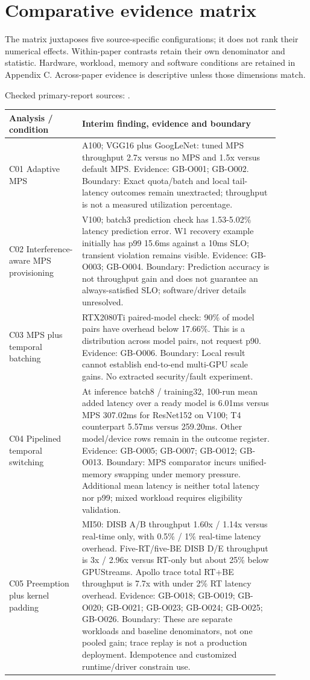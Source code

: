 \documentclass[12pt,a4paper]{article}
\begin{document}
\section{Comparative evidence matrix}
The matrix juxtaposes five source-specific configurations; it does not rank their numerical effects. Within-paper contrasts retain their own denominator and statistic. Hardware, workload, memory and software conditions are retained in Appendix C. Across-paper evidence is descriptive unless those dimensions match.


Checked primary-report sources: \cite{vastpipe,igniter,gpulets,pipeswitch,reef}. 
\begin{longtable}{p{0.24\linewidth}p{0.65\linewidth}}
\toprule
Analysis /\allowbreak{} condition & Interim finding, evidence and boundary\\\midrule
\endhead
C01 Adaptive MPS & A100; VGG16 plus GoogLeNet: tuned MPS throughput 2.7x versus no MPS and 1.5x versus default MPS. Evidence: GB-O001; GB-O002. Boundary: Exact quota/\allowbreak{}batch and local tail-latency outcomes remain unextracted; throughput is not a measured utilization percentage.\\
C02 Interference-aware MPS provisioning & V100; batch3 prediction check has 1.53-5.02\% latency prediction error. W1 recovery example initially has p99 15.6ms against a 10ms SLO; transient violation remains visible. Evidence: GB-O003; GB-O004. Boundary: Prediction accuracy is not throughput gain and does not guarantee an always-satisfied SLO; software/\allowbreak{}driver details unresolved.\\
C03 MPS plus temporal batching & RTX2080Ti paired-model check: 90\% of model pairs have overhead below 17.66\%. This is a distribution across model pairs, not request p90. Evidence: GB-O006. Boundary: Local result cannot establish end-to-end multi-GPU scale gains. No extracted security/\allowbreak{}fault experiment.\\
C04 Pipelined temporal switching & At inference batch8 /\allowbreak{} training32, 100-run mean added latency over a ready model is 6.01ms versus MPS 307.02ms for ResNet152 on V100; T4 counterpart 5.57ms versus 259.20ms. Other model/\allowbreak{}device rows remain in the outcome register. Evidence: GB-O005; GB-O007; GB-O012; GB-O013. Boundary: MPS comparator incurs unified-memory swapping under memory pressure. Additional mean latency is neither total latency nor p99; mixed workload requires eligibility validation.\\
C05 Preemption plus kernel padding & MI50: DISB A/\allowbreak{}B throughput 1.60x /\allowbreak{} 1.14x versus real-time only, with 0.5\% /\allowbreak{} 1\% real-time latency overhead. Five-RT/\allowbreak{}five-BE DISB D/\allowbreak{}E throughput is 3x /\allowbreak{} 2.96x versus RT-only but about 25\% below GPUStreams. Apollo trace total RT+BE throughput is 7.7x with under 2\% RT latency overhead. Evidence: GB-O018; GB-O019; GB-O020; GB-O021; GB-O023; GB-O024; GB-O025; GB-O026. Boundary: These are separate workloads and baseline denominators, not one pooled gain; trace replay is not a production deployment. Idempotence and customized runtime/\allowbreak{}driver constrain use.\\
\bottomrule
\end{longtable}
\end{document}
